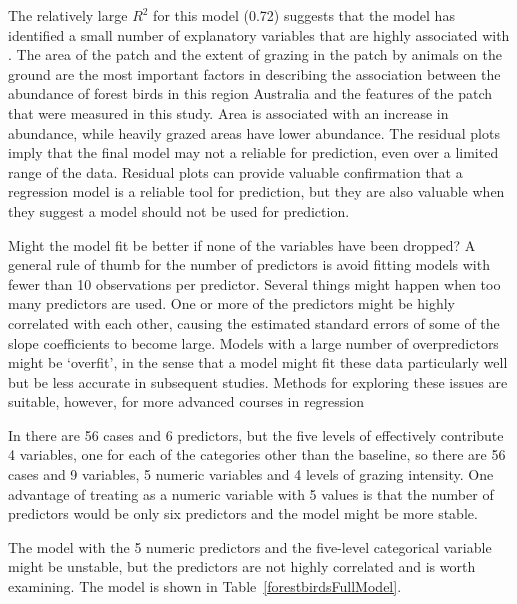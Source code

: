 The relatively large $R^2$ for this model (0.72) suggests that the model has identified a small number of explanatory variables that are highly associated with .  The area of the patch and the extent of grazing in the patch by animals on the ground are the most important factors in describing the association between the abundance of forest birds in this region Australia and the features of the patch that were measured in this study.  Area is associated with an increase in abundance, while heavily grazed areas have lower abundance. The residual plots imply that the final model may not a reliable for prediction, even over a limited range of the data.  Residual plots can provide valuable confirmation that a regression model is a reliable tool for prediction, but they are also valuable when they suggest a model should not be used for prediction.

Might the model fit be better if none of the variables have been dropped? A general rule of thumb for the number of predictors is avoid fitting models with fewer than 10 observations per predictor.  Several things might happen when too many predictors are used.  One or more of the predictors might be highly correlated with each other, causing the estimated standard errors of some of the slope coefficients to become large. Models with a large number of overpredictors might be `overfit', in the sense that a model might fit these data particularly well but be less accurate in subsequent studies.  Methods for exploring these issues are suitable, however, for more advanced courses in regression

In  there are 56 cases and 6 predictors, but the five levels of   effectively contribute 4 variables, one for each of the categories other than the baseline, so there are 56 cases and 9 variables, 5 numeric variables and 4 levels of grazing intensity.  One advantage of treating  as a numeric variable with 5 values is that the number of predictors would be only six predictors and the model might be more stable.

The model with the 5 numeric predictors and the five-level categorical variable  might be unstable, but the predictors are not highly correlated and is worth examining.   The model is shown in Table~\ref{forestbirdsFullModel}.

